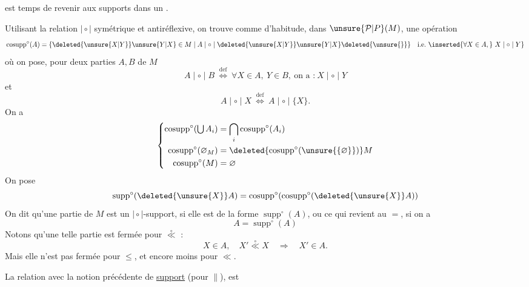 
 est temps de revenir aux supports  dans un .

Utilisant la relation $\mid\circ\mid$ symétrique et antiréflexive, on trouve comme d'habitude, dans $\unsure{\mathcal{P}|P}(M)$,  une opération
\[
\operatorname{cosupp}^{\circ}(A)=\{\deleted{\unsure{X|Y}}\unsure{Y|X}\in M\mid A\mid\circ\mid\deleted{\unsure{X|Y}}\unsure{Y|X}\deleted{\unsure{\}}}\quad\text{i.e.}\ \inserted{\forall X\in A,}\ X\mid\circ\mid Y\}
\]
où on pose, pour deux parties $A,B$ de $M$
\[
 A\mid\circ\mid B\ \overset{\mathrm{def}}{\Longleftrightarrow}\ \forall X\in A,\ Y\in B,\ \text{on a :}\ X\mid\circ\mid Y
\]
et
\[
 A\mid\circ\mid X\ \overset{\mathrm{def}}{\Longleftrightarrow}\ A\mid\circ\mid\{X\}.
\]
On  a
\[
\left\{\begin{aligned}
\operatorname{cosupp}^{\circ}(\textstyle\bigcup A_i)&=\bigcap_i\operatorname{cosupp}^{\circ}(A_i)\\
\operatorname{cosupp}^{\circ}(\varnothing_M)&=\deleted{\operatorname{cosupp}^{\circ}(\unsure{\{\varnothing\}})}M\\
\operatorname{cosupp}^{\circ}(M)&=\varnothing
\end{aligned}\right.
\]
On pose
\[
\operatorname{supp}^{\circ}(\deleted{\unsure{X}}A)=\operatorname{cosupp}^{\circ}(\operatorname{cosupp}^{\circ}(\deleted{\unsure{X}}A))
\]
On dit qu'une partie  de $M$ est un $\mid\circ\mid$-support, si elle est de la forme $\operatorname{supp}^{\circ}(A)$, ou ce qui revient au $=$, si on a
\[
 A=\operatorname{supp}^{\circ}(A)
\]
Notons qu'une telle partie est fermée pour $\overset{\circ}{\ll}$ :
\[
 X\in A,\quad X'\overset{\circ}{\ll}X\quad\Rightarrow\quad X'\in A.
\]
Mais elle n'est pas  fermée pour $\leq$, et encore moins pour $\ll$. 

La relation avec la notion précédente de \uline{support} (pour $\mathrel{\|}$),  est


